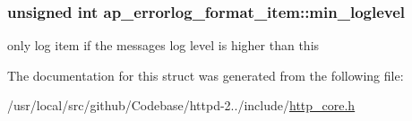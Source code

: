 \subsubsection[{\texorpdfstring{min\+\_\+loglevel}{min_loglevel}}]{\setlength{\rightskip}{0pt plus 5cm}unsigned {\bf int} ap\+\_\+errorlog\+\_\+format\+\_\+item\+::min\+\_\+loglevel}\hypertarget{structap__errorlog__format__item_afa953d1d14bb4dea3a444e374a1d0e80}{}\label{structap__errorlog__format__item_afa953d1d14bb4dea3a444e374a1d0e80}
only log item if the message\textquotesingle{}s log level is higher than this 

The documentation for this struct was generated from the following file\+:\begin{DoxyCompactItemize}
\item 
/usr/local/src/github/\+Codebase/httpd-\/2../include/\hyperlink{http__core_8h}{http\+\_\+core.\+h}\end{DoxyCompactItemize}
